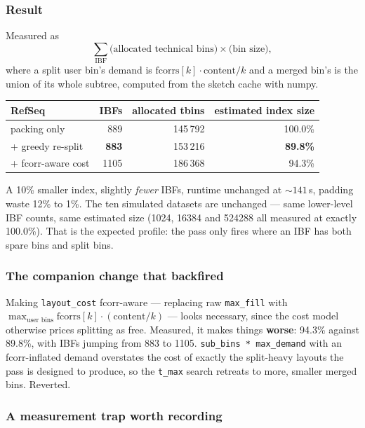 \documentclass[11pt,a4paper]{article}
\newcommand{\code}[1]{\lstinline[basicstyle=\ttfamily\small]!#1!}
\newcommand{\good}[1]{\textcolor{okgreen}{\textbf{#1}}}
\begin{document}
\subsubsection*{Result}

Measured as
\[
  \sum_{\text{IBF}} \bigl(\text{allocated technical bins}\bigr) \times \bigl(\text{bin size}\bigr),
\]
where a split user bin's demand is $\text{fcorrs}[k] \cdot \text{content}/k$ and a merged bin's is
the union of its whole subtree, computed from the sketch cache with numpy.

\begin{longtable}{@{}lrrr@{}}
\toprule
\textbf{RefSeq} & \textbf{IBFs} & \textbf{allocated tbins} & \textbf{estimated index size} \\
\midrule
packing only          & 889          & 145\,792 & 100.0\% \\
+ greedy re-split     & \good{883}   & 153\,216 & \good{89.8\%} \\
+ fcorr-aware cost    & 1105         & 186\,368 & 94.3\% \\
\bottomrule
\end{longtable}

\noindent A 10\% smaller index, slightly \emph{fewer} IBFs, runtime unchanged at ${\sim}141$\,s,
padding waste 12\% to 1\%. The ten simulated datasets are unchanged --- same lower-level IBF counts,
same estimated size (1024, 16384 and 524288 all measured at exactly 100.0\%). That is the expected
profile: the pass only fires where an IBF has both spare bins and split bins.

\subsubsection*{The companion change that backfired}

Making \code{layout_cost} fcorr-aware --- replacing raw \code{max_fill} with
$\max_{\text{user bins}} \text{fcorrs}[k] \cdot (\text{content}/k)$ --- looks necessary, since the
cost model otherwise prices splitting as free. Measured, it makes things \textbf{worse}: 94.3\%
against 89.8\%, with IBFs jumping from 883 to 1105.
\code{sub_bins * max_demand} with an fcorr-inflated demand overstates the cost of exactly the
split-heavy layouts the pass is designed to produce, so the \code{t_max} search retreats to more,
smaller merged bins. Reverted.

\subsubsection*{A measurement trap worth recording}
\end{document}
